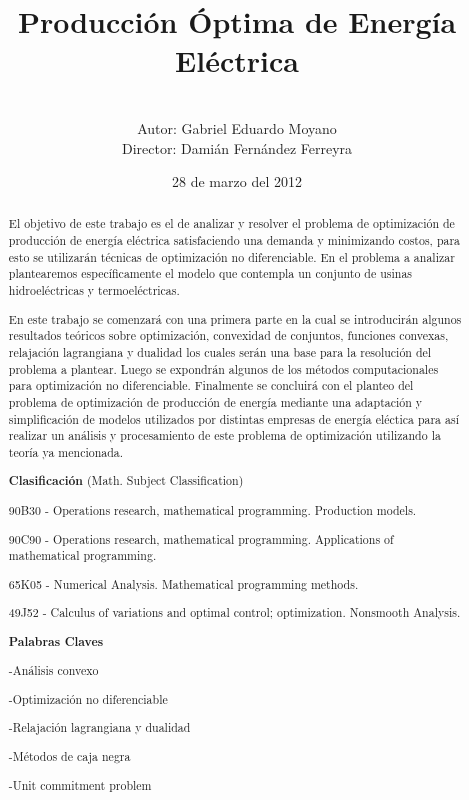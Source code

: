 \documentclass[a4paper,12pt]{report}
\title{Producci\'on \'Optima de Energ\'ia El\'ectrica}
\author{\vspace{5.4cm}\\ \hspace{3.6cm} Autor: Gabriel Eduardo Moyano\\ \hspace{4.6cm} Director: Dami\'an Fern\'andez Ferreyra}
\date{28 de marzo del 2012}
\begin{document}

\maketitle

\begin{abstract}

El objetivo de este trabajo es el de analizar y resolver el problema de optimizaci\'on de producci\'on de energ\'ia el\'ectrica satisfaciendo una demanda y minimizando costos, para esto se utilizar\'an t\'ecnicas de optimizaci\'on no diferenciable. En el problema a analizar plantearemos espec\'ificamente el modelo que contempla un conjunto de usinas hidroel\'ectricas y termoel\'ectricas.

En este trabajo se comenzar\'a con una primera parte en la cual se introducir\'an algunos resultados te\'oricos sobre optimizaci\'on, convexidad de conjuntos, funciones convexas, relajaci\'on lagrangiana y dualidad los cuales ser\'an una base para la  resoluci\'on del problema a plantear. Luego se expondr\'an algunos de los m\'etodos computacionales para optimizaci\'on no diferenciable. Finalmente se concluir\'a con el planteo del problema de optimizaci\'on de producci\'on de energ\'ia mediante una adaptaci\'on y simplificaci\'on de modelos utilizados por distintas empresas de energ\'ia el\'ectica para as\'i realizar un an\'alisis y procesamiento de este problema de optimizaci\'on utilizando la teor\'ia ya mencionada.


\vspace{4cm}


{\bf Clasificaci\'on} (Math. Subject Classification)
\vspace{.2cm}

\quad 90B30 - Operations research, mathematical programming. Production models.

\quad 90C90 - Operations research, mathematical programming. Applications of ma\-the\-ma\-ti\-cal programming.

\quad 65K05 - Numerical Analysis. Mathematical programming methods.

\quad 49J52 - Calculus of variations and optimal control; optimization. Nonsmooth Analysis.

\vspace{1cm}
{\bf Palabras Claves}
\vspace{.2cm}

\qquad  -An\'alisis convexo

\qquad  -Optimizaci\'on no diferenciable

\qquad  -Relajaci\'on lagrangiana y dualidad

\qquad  -M\'etodos de caja negra

\qquad  -Unit commitment problem


\end{abstract}
\end{document}
